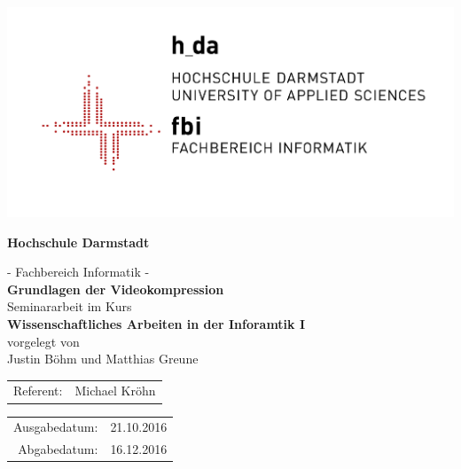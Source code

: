 
\begin{titlepage}
\begin{center}
\includegraphics[scale=1.5]{gfx/LG0_fbi_r5005_lzw.png}

\vspace{0.8cm}
{\sf

{\LARGE\textbf{Hochschule Darmstadt}}\\ 

{\Large - Fachbereich Informatik - \\ 

\vspace{2.0cm} 
{\Huge\textbf{Grundlagen der Videokompression}}\\ 

\vspace{2.0cm}
Seminararbeit im Kurs\\
\textbf{Wissenschaftliches Arbeiten in der Inforamtik I}\\ 

\vspace{1.0cm}
vorgelegt von\\ 
Justin Böhm und Matthias Greune

\vspace{1.0cm} 
\begin{tabular}{rl} 
Referent:& Michael Kröhn\\
\end{tabular}

\vspace{0.5cm}
\begin{tabular}{rl}
Ausgabedatum:& 21.10.2016\\
Abgabedatum:& 16.12.2016
\end{tabular}

} %

}

\end{center}
\end{titlepage}
